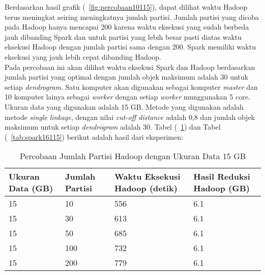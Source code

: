 Berdasarkan hasil grafik (~\ref{fig:percobaan10115}), dapat dilihat waktu Hadoop terus meningkat seiring meningkatnya jumlah partisi. Jumlah partisi yang dicoba pada Hadoop hanya mencapai 200 karena waktu eksekusi yang sudah berbeda jauh dibanding Spark dan untuk partisi yang lebih besar pasti diatas waktu eksekusi Hadoop dengan jumlah partisi sama dengan 200. Spark memiliki waktu eksekusi yang jauh lebih cepat dibanding Hadoop.  \\





Pada percobaan ini akan dilihat waktu eksekusi Spark dan Hadoop berdasarkan jumlah partisi yang optimal dengan jumlah objek maksimum adalah 30 untuk setiap \textit{dendrogram}. Satu komputer akan digunakan sebagai komputer \textit{master} dan 10 komputer lainya sebagai \textit{worker} dengan setiap \textit{worker} munggunakan 5 core. Ukuran data yang digunakan adalah 15 GB. Metode yang digunakan adalah metode \textit{single linkage}, dengan nilai \textit{cut-off distance} adalah 0,8 dan jumlah objek maksimum untuk setiap \textit{dendrogram} adalah 30. Tabel (~\ref{tab:spark15115}) dan Tabel (~\ref{tab:spark16115}) berikut adalah hasil dari eksperimen:





\begin{table}[H] 
	\centering 
	\caption{Percobaan Jumlah Partisi Hadoop dengan Ukuran Data 15 GB}
	\label{tab:spark15115}
	\begin{tabular}{|p{3cm}|p{3cm}|p{4cm}|p{4cm}|}
\hline
Ukuran Data (GB) & Jumlah Partisi &  Waktu Eksekusi Hadoop (detik) & Hasil Reduksi Hadoop (GB)\\
\hline
15 & 10 & 556  & 6.1  \\
\hline
15 & 30 & 613  & 6.1  \\
\hline
15 & 50 & 685  & 6.1  \\
\hline
15 & 100 & 732  & 6.1  \\
\hline
15 & 200 & 779  & 6.1  \\
\hline


\hline

	\end{tabular} 
\end{table}




